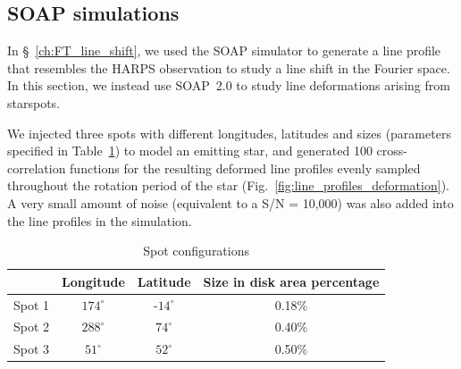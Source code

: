 
\subsection{SOAP simulations}
\label{sec:Simulations}

In \S~\ref{ch:FT_line_shift}, we used the SOAP simulator to generate a line profile that resembles the HARPS observation to study a line shift in the Fourier space. In this section, we instead use SOAP~2.0 to study line deformations arising from starspots. 

We injected three spots with different longitudes, latitudes and sizes (parameters specified in Table~\ref{table:spot_configurations}) to model an emitting star, and generated 100 cross-correlation functions for the resulting  deformed line profiles evenly sampled throughout the rotation period of the star (Fig.~\ref{fig:line_profiles_deformation}). A very small amount of noise (equivalent to a S/N = 10,000) was also added into the line profiles in the simulation. 

\begin{table}[htbp]
\centering
\begin{tabular}{|c|c|c|c|}
\hline 
 & Longitude & Latitude & Size in disk area percentage\\ 
\hline 
Spot 1 & $174^\circ$ & -$14^\circ$ & 0.18\% \\ 
\hline 
Spot 2 & $288^\circ$ & $74^\circ$  & 0.40\% \\ 
\hline 
Spot 3 & $51^\circ$  & $52^\circ$  & 0.50\% \\ 
\hline 
\end{tabular} 
\caption{Spot configurations}
\label{table:spot_configurations}
\end{table}

